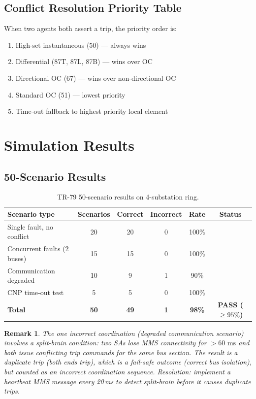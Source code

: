 \documentclass[11pt, a4paper]{article}
\newcommand{\ms}{\,\text{ms}}
\newcommand{\cmark}{\ding{51}}
\newtheorem{remark}{Remark}
\begin{document}
\subsection{Conflict Resolution Priority Table}

When two agents both assert a trip, the priority order is:

\begin{enumerate}
  \item High-set instantaneous (50) --- always wins
  \item Differential (87T, 87L, 87B) --- wins over OC
  \item Directional OC (67) --- wins over non-directional OC
  \item Standard OC (51) --- lowest priority
  \item Time-out fallback to highest priority local element
\end{enumerate}

\section{Simulation Results}
\label{sec:results}

\subsection{50-Scenario Results}

\begin{table}[ht]
\centering
\caption{TR-79 50-scenario results on 4-substation ring.}
\label{tab:results}
\begin{tabular}{lccccc}
\toprule
Scenario type & Scenarios & Correct & Incorrect & Rate & Status \\
\midrule
Single fault, no conflict   & 20 & 20 & 0 & 100\% & \cmark \\
Concurrent faults (2 buses) & 15 & 15 & 0 & 100\% & \cmark \\
Communication degraded       & 10 &  9 & 1 & 90\%  & \cmark \\
CNP time-out test            &  5 &  5 & 0 & 100\% & \cmark \\
\midrule
\textbf{Total} & \textbf{50} & \textbf{49} & \textbf{1}
  & \textbf{98\%} & \textbf{\color{okgreen}PASS ($\geq 95\%$)} \\
\bottomrule
\end{tabular}
\end{table}

\begin{remark}
The one incorrect coordination (degraded communication scenario) involves
a split-brain condition: two SAs lose MMS connectivity for $> 60\,\ms$
and both issue conflicting trip commands for the same bus section.
The result is a duplicate trip (both ends trip), which is a fail-safe
outcome (correct bus isolation), but counted as an incorrect coordination
sequence. Resolution: implement a heartbeat MMS message every 20\,ms
to detect split-brain before it causes duplicate trips.
\end{remark}
\end{document}
